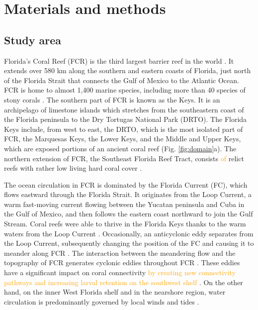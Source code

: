 \documentclass[fleqn,10pt]{wlscirep}
\newcommand{\modif}[1]{\textcolor{orange}{#1}}
\begin{document}
\section{Materials and methods}
\subsection{Study area}
Florida's Coral Reef (FCR) is the third largest barrier reef in the world \citep{Finkl2008Jul}. It extends over 580 km along the southern and eastern coasts of Florida, just north of the Florida Strait that connects the Gulf of Mexico to the Atlantic Ocean. FCR is home to almost 1,400 marine species, including more than 40 species of stony corals \citep{Banks2008}. The southern part of FCR is known as the Keys. It is an archipelago of limestone islands which stretches from the southeastern coast of the Florida peninsula to the Dry Tortugas National Park (DRTO). The Florida Keys include, from west to east, the DRTO, which is the most isolated part of FCR, the Marquesas Keys, the Lower Keys, and the Middle and Upper Keys, which are exposed portions of an ancient coral reef (Fig. \ref{fig:domain}a). The northern extension of FCR, the Southeast Florida Reef Tract, consists \modif{of} relict reefs with rather low living hard coral cover \citep{Hoffmeister1968Nov,Banks2008}.

The ocean circulation in FCR is dominated by the Florida Current (FC), which flows eastward through the Florida Strait. It originates from the Loop Current, a warm fast-moving current flowing between the Yucatan peninsula and Cuba in the Gulf of Mexico, and then follows the eastern coast northward to join the Gulf Stream. Coral reefs were able to thrive in the Florida Keys thanks to the warm waters from the Loop Current \citep{Donahue2008Jan}. Occasionally, an anticyclonic eddy separates from the Loop Current, subsequently changing the position of the FC and causing it to meander along FCR \citep{Leipper1970Jan,Vukovich1988Dec}. The interaction between the meandering flow and the topography of FCR generates cyclonic eddies throughout FCR \citep{Kourafalou2012May}. These eddies have a significant impact on coral connectivity \modif{by creating new connectivity pathways \citep{Limouzy-Paris1997Jul} and increasing larval retention on the southwest shelf \citep{Lee1994May}}. On the other hand, on the inner West Florida shelf and  in the nearshore region, water circulation is predominantly governed by local winds and tides \citep{Lee2002Jun,Sponaugle2007Feb}.
\end{document}
